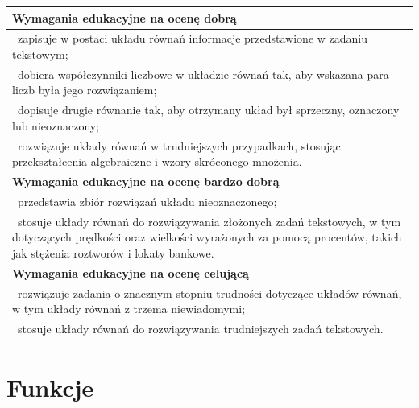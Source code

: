\documentclass[12pt,a4paper]{article}
\begin{document}
\begin{longtable}{|p{16cm}|}
		\textbf{Wymagania edukacyjne na ocenę dobrą} \\ \hline
		
		\textbullet\ zapisuje w postaci układu równań informacje przedstawione w zadaniu tekstowym; \\
		
		\textbullet\ dobiera współczynniki liczbowe w układzie równań tak, aby wskazana para liczb była jego rozwiązaniem; \\
		
		\textbullet\ dopisuje drugie równanie tak, aby otrzymany układ był sprzeczny, oznaczony lub nieoznaczony; \\
		
		\textbullet\ rozwiązuje układy równań w trudniejszych przypadkach, stosując przekształcenia algebraiczne i wzory skróconego mnożenia. \\ \hline
		
		\textbf{Wymagania edukacyjne na ocenę bardzo dobrą} \\ \hline
		
		\textbullet\ przedstawia zbiór rozwiązań układu nieoznaczonego; \\
		
		\textbullet\ stosuje układy równań do rozwiązywania złożonych zadań tekstowych, w tym dotyczących prędkości oraz wielkości wyrażonych za pomocą procentów, takich jak stężenia roztworów i lokaty bankowe. \\ \hline
		
		\textbf{Wymagania edukacyjne na ocenę celującą} \\ \hline
		
		\textbullet\ rozwiązuje zadania o znacznym stopniu trudności dotyczące układów równań, w tym układy równań z trzema niewiadomymi; \\
		
		\textbullet\ stosuje układy równań do rozwiązywania trudniejszych zadań tekstowych. \\ \hline
		
	\end{longtable}
	
	\section{Funkcje}
	
\end{document}
